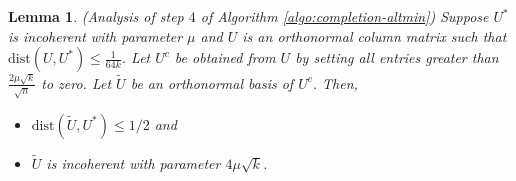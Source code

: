 \documentclass[11pt]{article}
\theoremstyle{plain}
\newtheorem{lemma}[theorem]{Lemma}
\theoremstyle{definition}
\newcommand{\dist}{\mathrm{dist}}
\begin{document}
\begin{lemma}\label{lemma:clipping-incoherence-distance}(Analysis of step $4$ of Algorithm \ref{algo:completion-altmin})
  Suppose $U^*$ is incoherent with parameter $\mu$ and $U$ is an orthonormal column matrix such that $\dist\left(U,U^*\right) \leq \frac{1}{64k}$.
Let $U^c$ be obtained from $U$ by setting all entries greater than $\frac{2\mu\sqrt{k}}{\sqrt{n}}$  to zero. Let $\widetilde{U}$ be an orthonormal basis of $U^c$. Then,\vspace*{-4pt}\setlength{\topsep}{-5pt}\setlength{\itemsep}{-5pt}
\begin{itemize}\setlength{\topsep}{-5pt}\setlength{\itemsep}{-5pt}
  \item	$\dist\left(\widetilde{U},U^*\right) \leq 1/2$ and
  \item	$\widetilde{U}$ is incoherent with parameter $4\mu \sqrt{k}$.\vspace*{-5pt}
\end{itemize}
\end{lemma}
\end{document}
